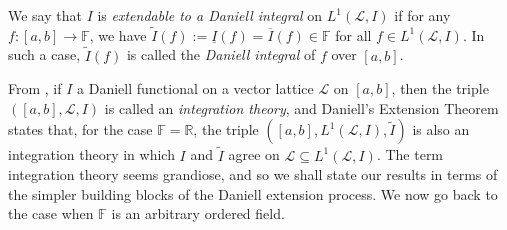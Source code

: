 \documentclass[11pt,a4paper]{article}
\def\R{\mathbb{R}}
\def\F{\mathbb{F}}
\def\lbrak{\left[}
\def\rbrak{\right]}
\def\abClosed{\lbrak a,b\rbrak}
\def\stepLatt{\mathcal{L}}
\def\into{\longrightarrow}
\def\sub{\subseteq}
\begin{document}
We say that $I$ is \emph{extendable to a Daniell integral} on $L^1(\stepLatt,I)$ if for any $f:\abClosed\into\F$, we have $\widetilde{I}(f):=\underline{I}(f) = \overline{I}(f)\in\F$ for all $f\in L^1(\stepLatt,I)$. In such a case, $\widetilde{I}(f)$ is called the \emph{Daniell integral} of $f$ over $\abClosed$.

From \cite[p.~247]{str20}, if $I$ a Daniell functional on a vector lattice $\stepLatt$ on $\abClosed$, then the triple $(\abClosed,\stepLatt,I)$ is called an \emph{integration theory}, and Daniell's Extension Theorem states that, for the case $\F=\R$, the triple $(\abClosed,L^1(\stepLatt,I),\widetilde{I})$ is also an integration theory in which $I$ and $\widetilde{I}$ agree on $\stepLatt\sub L^1(\stepLatt,I)$. The term integration theory seems grandiose, and so we shall state our results in terms of the simpler building blocks of the Daniell extension process. We now go back to the case when $\F$ is an arbitrary ordered field.
\end{document}
